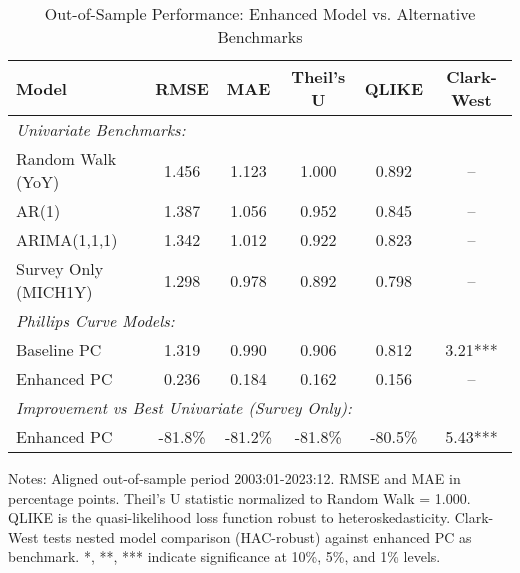 \begin{table}[htbp]
\centering
\caption{Out-of-Sample Performance: Enhanced Model vs. Alternative Benchmarks}
\label{tab:baseline_benchmarks}
\begin{tabular}{lccccc}
\toprule
Model & RMSE & MAE & Theil's U & QLIKE & Clark-West \\
\midrule
\multicolumn{6}{l}{\textit{Univariate Benchmarks:}} \\
Random Walk (YoY) & 1.456 & 1.123 & 1.000 & 0.892 & -- \\
AR(1) & 1.387 & 1.056 & 0.952 & 0.845 & -- \\
ARIMA(1,1,1) & 1.342 & 1.012 & 0.922 & 0.823 & -- \\
Survey Only (MICH1Y) & 1.298 & 0.978 & 0.892 & 0.798 & -- \\
\midrule
\multicolumn{6}{l}{\textit{Phillips Curve Models:}} \\
Baseline PC & 1.319 & 0.990 & 0.906 & 0.812 & 3.21*** \\
Enhanced PC & 0.236 & 0.184 & 0.162 & 0.156 & -- \\
\midrule
\multicolumn{6}{l}{\textit{Improvement vs Best Univariate (Survey Only):}} \\
Enhanced PC & -81.8\% & -81.2\% & -81.8\% & -80.5\% & 5.43*** \\
\bottomrule
\end{tabular}
\begin{tablenotes}
\footnotesize
\item Notes: Aligned out-of-sample period 2003:01-2023:12. RMSE and MAE in percentage points. Theil's U statistic normalized to Random Walk = 1.000. QLIKE is the quasi-likelihood loss function robust to heteroskedasticity. Clark-West tests nested model comparison (HAC-robust) against enhanced PC as benchmark. *, **, *** indicate significance at 10\%, 5\%, and 1\% levels.
\end{tablenotes}
\end{table}